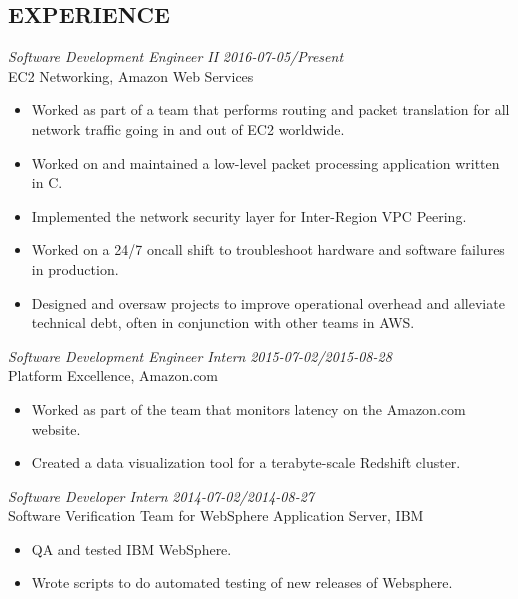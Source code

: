 \documentclass[overlapped, 10pt]{res} %
\begin{document}
\begin{resume}
 
\section{EXPERIENCE}

{\sl Software Development Engineer II} \hfill {\sl 2016-07-05/Present} \\
EC2 Networking, Amazon Web Services
\begin{itemize} \itemsep -2pt %
    \item Worked as part of a team that performs routing and packet translation for all network traffic going in and out of EC2 worldwide.
    \item Worked on and maintained a low-level packet processing application written in C.
    \item Implemented the network security layer for Inter-Region VPC Peering.
    \item Worked on a 24/7 oncall shift to troubleshoot hardware and software failures in production.
    \item Designed and oversaw projects to improve operational overhead and alleviate technical debt, often in conjunction with other teams in AWS.
\end{itemize}
{\sl Software Development Engineer Intern} \hfill {\sl 2015-07-02/2015-08-28} \\
Platform Excellence, Amazon.com
\begin{itemize} \itemsep -2pt %
    \item Worked as part of the team that monitors latency on the Amazon.com website.
    \item Created a data visualization tool for a terabyte-scale Redshift cluster.
\end{itemize}
{\sl Software Developer Intern} \hfill {\sl 2014-07-02/2014-08-27} \\
Software Verification Team for WebSphere Application Server, IBM
\begin{itemize} \itemsep -2pt %
    \item QA and tested IBM WebSphere.
    \item Wrote scripts to do automated testing of new releases of Websphere.
\end{itemize}
 


\end{resume}
\end{document}
